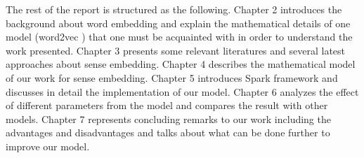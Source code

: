 The rest of the report is structured as the following. Chapter 2 introduces the background about word embedding and explain the mathematical details of one model (word2vec \cite{MikolovSutskeverEtAl2013}) that one must be acquainted with in order to understand the work presented. Chapter 3 presents some relevant literatures and several latest approaches about sense embedding. Chapter 4 describes the mathematical model of our work for sense embedding. Chapter 5 introduces Spark framework and discusses in detail the implementation of our model. Chapter 6 analyzes the effect of different parameters from the model and compares the result with other models. Chapter 7 represents concluding remarks to our work including the advantages and disadvantages and talks about what can be done further to improve our model.
